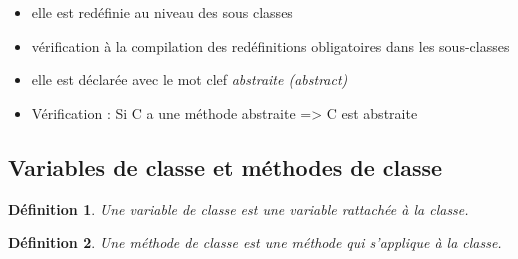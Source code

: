 \documentclass{article}
\newtheorem{definition}{Définition}
\begin{document}
\begin{itemize}
	\item elle est redéfinie au niveau des sous classes
	\item vérification à la compilation des redéfinitions obligatoires dans les
	sous-classes
	\item elle est déclarée avec le mot clef \emph{abstraite (abstract)}
	\item Vérification : Si C a une méthode abstraite => C est abstraite
\end{itemize}

\subsection{Variables de classe et méthodes de classe}

\begin{definition}
	Une variable de classe est une variable rattachée à la classe.
\end{definition}

\begin{definition}
	Une méthode de classe est une méthode qui s'applique à la classe.
\end{definition}
\end{document}
